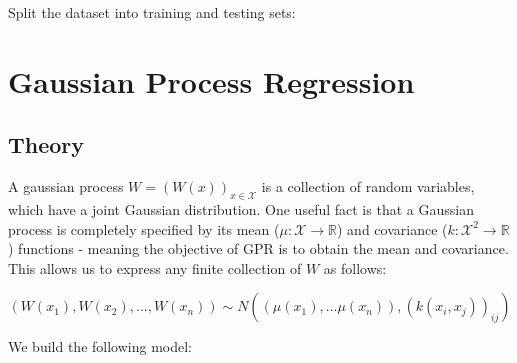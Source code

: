 \documentclass[
]{article}
\newenvironment{Shaded}{\begin{snugshade}}{\end{snugshade}}
\newcommand{\CommentTok}[1]{\textcolor[rgb]{0.56,0.35,0.01}{\textit{#1}}}
\newcommand{\DecValTok}[1]{\textcolor[rgb]{0.00,0.00,0.81}{#1}}
\newcommand{\FloatTok}[1]{\textcolor[rgb]{0.00,0.00,0.81}{#1}}
\newcommand{\FunctionTok}[1]{\textcolor[rgb]{0.13,0.29,0.53}{\textbf{#1}}}
\newcommand{\NormalTok}[1]{#1}
\newcommand{\OtherTok}[1]{\textcolor[rgb]{0.56,0.35,0.01}{#1}}
\newcommand{\SpecialCharTok}[1]{\textcolor[rgb]{0.81,0.36,0.00}{\textbf{#1}}}
\begin{document}
Split the dataset into training and testing sets:

\begin{Shaded}
\end{Shaded}

\hypertarget{gaussian-process-regression}{%
\section{Gaussian Process
Regression}\label{gaussian-process-regression}}

\hypertarget{theory-1}{%
\subsection{Theory}\label{theory-1}}

A gaussian process \(W = (W(x))_{x \in \mathcal{X}}\) is a collection of
random variables, which have a joint Gaussian distribution. One useful
fact is that a Gaussian process is completely specified by its mean
(\(\mu:\mathcal{X} \rightarrow \mathbb{R}\)) and covariance
(\(k:\mathcal{X}^2 \rightarrow \mathbb{R}\)) functions - meaning the
objective of GPR is to obtain the mean and covariance. This allows us to
express any finite collection of \(W\) as follows:

\[
(W(x_1), W(x_2), ..., W(x_n)) \sim N((\mu(x_1),...\mu(x_n)), (k(x_i,x_j))_{ij})
\]

We build the following model:
\end{document}
